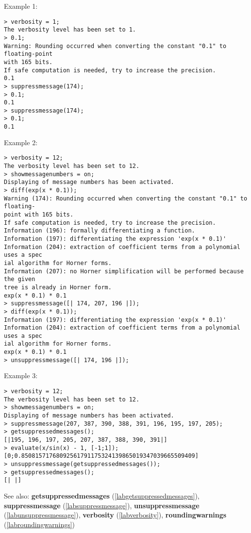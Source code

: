\noindent Example 1: 
\begin{center}\begin{minipage}{15cm}\begin{Verbatim}[frame=single]
> verbosity = 1;
The verbosity level has been set to 1.
> 0.1;
Warning: Rounding occurred when converting the constant "0.1" to floating-point 
with 165 bits.
If safe computation is needed, try to increase the precision.
0.1
> suppressmessage(174);
> 0.1;
0.1
> suppressmessage(174);
> 0.1;
0.1
\end{Verbatim}
\end{minipage}\end{center}
\noindent Example 2: 
\begin{center}\begin{minipage}{15cm}\begin{Verbatim}[frame=single]
> verbosity = 12;
The verbosity level has been set to 12.
> showmessagenumbers = on; 
Displaying of message numbers has been activated.
> diff(exp(x * 0.1));
Warning (174): Rounding occurred when converting the constant "0.1" to floating-
point with 165 bits.
If safe computation is needed, try to increase the precision.
Information (196): formally differentiating a function.
Information (197): differentiating the expression 'exp(x * 0.1)'
Information (204): extraction of coefficient terms from a polynomial uses a spec
ial algorithm for Horner forms.
Information (207): no Horner simplification will be performed because the given 
tree is already in Horner form.
exp(x * 0.1) * 0.1
> suppressmessage([| 174, 207, 196 |]);
> diff(exp(x * 0.1));
Information (197): differentiating the expression 'exp(x * 0.1)'
Information (204): extraction of coefficient terms from a polynomial uses a spec
ial algorithm for Horner forms.
exp(x * 0.1) * 0.1
> unsuppressmessage([| 174, 196 |]);
\end{Verbatim}
\end{minipage}\end{center}
\noindent Example 3: 
\begin{center}\begin{minipage}{15cm}\begin{Verbatim}[frame=single]
> verbosity = 12;
The verbosity level has been set to 12.
> showmessagenumbers = on;
Displaying of message numbers has been activated.
> suppressmessage(207, 387, 390, 388, 391, 196, 195, 197, 205);
> getsuppressedmessages();
[|195, 196, 197, 205, 207, 387, 388, 390, 391|]
> evaluate(x/sin(x) - 1, [-1;1]);
[0;0.85081571768092561791175324139865019347039665509409]
> unsuppressmessage(getsuppressedmessages());
> getsuppressedmessages();
[| |]
\end{Verbatim}
\end{minipage}\end{center}
See also: \textbf{getsuppressedmessages} (\ref{labgetsuppressedmessages}), \textbf{suppressmessage} (\ref{labsuppressmessage}), \textbf{unsuppressmessage} (\ref{labunsuppressmessage}), \textbf{verbosity} (\ref{labverbosity}), \textbf{roundingwarnings} (\ref{labroundingwarnings})
